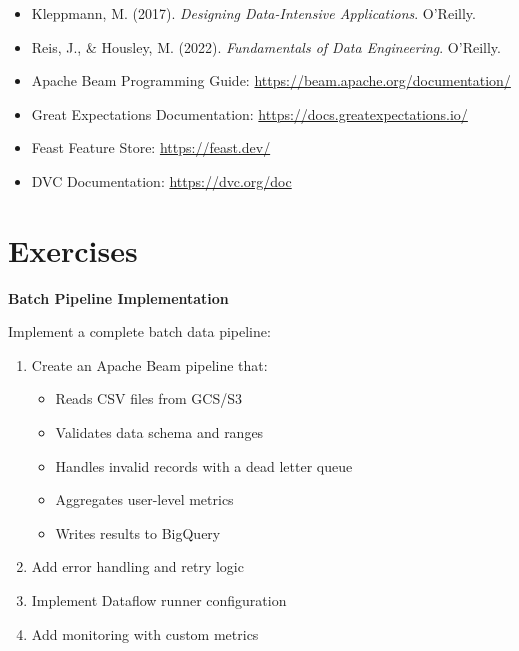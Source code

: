 \begin{itemize}
    \item Kleppmann, M. (2017). \textit{Designing Data-Intensive Applications}. O'Reilly.
    \item Reis, J., \& Housley, M. (2022). \textit{Fundamentals of Data Engineering}. O'Reilly.
    \item Apache Beam Programming Guide: \url{https://beam.apache.org/documentation/}
    \item Great Expectations Documentation: \url{https://docs.greatexpectations.io/}
    \item Feast Feature Store: \url{https://feast.dev/}
    \item DVC Documentation: \url{https://dvc.org/doc}
\end{itemize}

\section{Exercises}

\begin{exercise}
\textbf{Batch Pipeline Implementation}

Implement a complete batch data pipeline:

\begin{enumerate}
    \item Create an Apache Beam pipeline that:
    \begin{itemize}
        \item Reads CSV files from GCS/S3
        \item Validates data schema and ranges
        \item Handles invalid records with a dead letter queue
        \item Aggregates user-level metrics
        \item Writes results to BigQuery
    \end{itemize}
    \item Add error handling and retry logic
    \item Implement Dataflow runner configuration
    \item Add monitoring with custom metrics
\end{enumerate}
\end{exercise}

